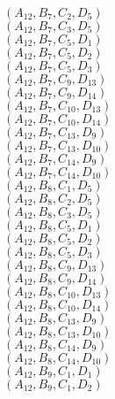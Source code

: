 \documentclass[14pt]{article}
\begin{document}
    $({A}_{12}, {B}_{7}, {C}_{2}, {D}_{5}) $ \\ 
    $({A}_{12}, {B}_{7}, {C}_{3}, {D}_{5}) $ \\ 
    $({A}_{12}, {B}_{7}, {C}_{5}, {D}_{1}) $ \\ 
    $({A}_{12}, {B}_{7}, {C}_{5}, {D}_{2}) $ \\ 
    $({A}_{12}, {B}_{7}, {C}_{5}, {D}_{3}) $ \\ 
    $({A}_{12}, {B}_{7}, {C}_{9}, {D}_{13}) $ \\ 
    $({A}_{12}, {B}_{7}, {C}_{9}, {D}_{14}) $ \\ 
    $({A}_{12}, {B}_{7}, {C}_{10}, {D}_{13}) $ \\ 
    $({A}_{12}, {B}_{7}, {C}_{10}, {D}_{14}) $ \\ 
    $({A}_{12}, {B}_{7}, {C}_{13}, {D}_{9}) $ \\ 
    $({A}_{12}, {B}_{7}, {C}_{13}, {D}_{10}) $ \\ 
    $({A}_{12}, {B}_{7}, {C}_{14}, {D}_{9}) $ \\ 
    $({A}_{12}, {B}_{7}, {C}_{14}, {D}_{10}) $ \\ 
    $({A}_{12}, {B}_{8}, {C}_{1}, {D}_{5}) $ \\ 
    $({A}_{12}, {B}_{8}, {C}_{2}, {D}_{5}) $ \\ 
    $({A}_{12}, {B}_{8}, {C}_{3}, {D}_{5}) $ \\ 
    $({A}_{12}, {B}_{8}, {C}_{5}, {D}_{1}) $ \\ 
    $({A}_{12}, {B}_{8}, {C}_{5}, {D}_{2}) $ \\ 
    $({A}_{12}, {B}_{8}, {C}_{5}, {D}_{3}) $ \\ 
    $({A}_{12}, {B}_{8}, {C}_{9}, {D}_{13}) $ \\ 
    $({A}_{12}, {B}_{8}, {C}_{9}, {D}_{14}) $ \\ 
    $({A}_{12}, {B}_{8}, {C}_{10}, {D}_{13}) $ \\ 
    $({A}_{12}, {B}_{8}, {C}_{10}, {D}_{14}) $ \\ 
    $({A}_{12}, {B}_{8}, {C}_{13}, {D}_{9}) $ \\ 
    $({A}_{12}, {B}_{8}, {C}_{13}, {D}_{10}) $ \\ 
    $({A}_{12}, {B}_{8}, {C}_{14}, {D}_{9}) $ \\ 
    $({A}_{12}, {B}_{8}, {C}_{14}, {D}_{10}) $ \\ 
    $({A}_{12}, {B}_{9}, {C}_{1}, {D}_{1}) $ \\ 
    $({A}_{12}, {B}_{9}, {C}_{1}, {D}_{2}) $ \\ 
\end{document}
